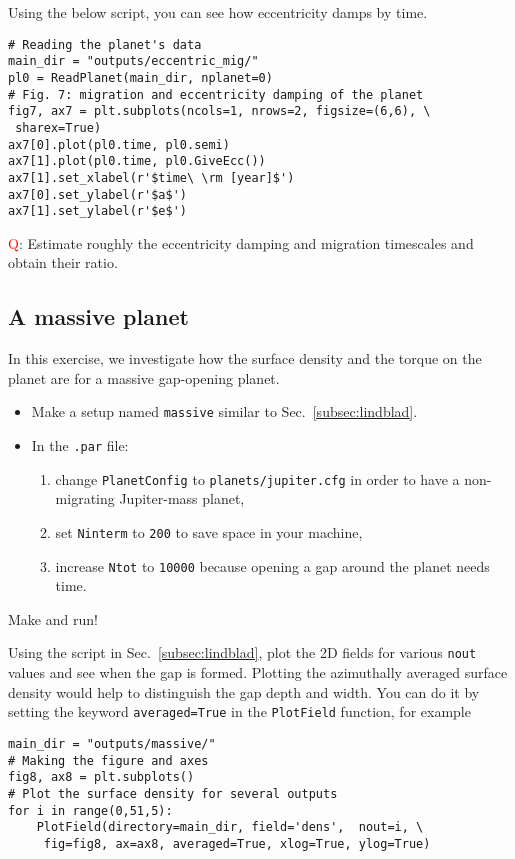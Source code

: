 \documentclass[14pt]{scrartcl}
\begin{document}
Using the below script, you can see how eccentricity damps by time.
\begin{verbatim}
# Reading the planet's data
main_dir = "outputs/eccentric_mig/"
pl0 = ReadPlanet(main_dir, nplanet=0)
# Fig. 7: migration and eccentricity damping of the planet
fig7, ax7 = plt.subplots(ncols=1, nrows=2, figsize=(6,6), \
 sharex=True)
ax7[0].plot(pl0.time, pl0.semi)
ax7[1].plot(pl0.time, pl0.GiveEcc())
ax7[1].set_xlabel(r'$time\ \rm [year]$')
ax7[0].set_ylabel(r'$a$')
ax7[1].set_ylabel(r'$e$')
\end{verbatim}

\textcolor{red}{Q}: Estimate roughly the eccentricity damping and migration timescales and obtain their ratio.

\subsection{A massive planet} \label{subsec:gap}
In this exercise, we investigate how the surface density and the torque on the planet are for a massive gap-opening planet.  
\begin{itemize}
	\item Make a setup named \texttt{massive} similar to Sec.~\ref{subsec:lindblad}.
	\item In the \texttt{.par} file:
	\begin{enumerate}
		\item change \texttt{PlanetConfig} to \texttt{planets/jupiter.cfg} in order to have a non-migrating Jupiter-mass planet,
		\item set \texttt{Ninterm} to \texttt{200} to save space in your machine,
		\item increase \texttt{Ntot} to \texttt{10000} because opening a gap around the planet needs time.
	\end{enumerate}
\end{itemize}
Make and run!

Using the script in Sec.~\ref{subsec:lindblad}, plot the 2D fields for various \texttt{nout} values and see when the gap is formed. Plotting the azimuthally averaged surface density would help to distinguish the gap depth and width. You can do it by setting the keyword \texttt{averaged=True} in the \texttt{PlotField} function, for example

\begin{verbatim}
main_dir = "outputs/massive/"
# Making the figure and axes
fig8, ax8 = plt.subplots()
# Plot the surface density for several outputs
for i in range(0,51,5):    
    PlotField(directory=main_dir, field='dens',  nout=i, \
     fig=fig8, ax=ax8, averaged=True, xlog=True, ylog=True)
\end{verbatim}
\end{document}
